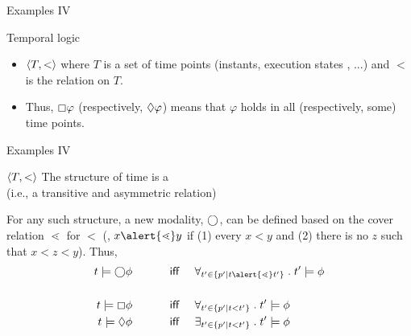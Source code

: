 \documentclass{beamer}
\begin{document}
\begin{slide}{Examples IV}\label{s:18}
\small
\begin{block}{Temporal logic}
\begin{itemize}
\item $\mathopen{\langle}T, <\mathclose{\rangle}$ where $T$ is a set of time points (instants, execution states , ...) and $<$ is the  relation on $T$.
\item Thus, $\boxempty \varphi$ (respectively, $\Diamond \varphi$) means that $\varphi$ holds in all (respectively, some)  time points.
\end{itemize}
\end{block}
\end{slide}

\begin{slide}{Examples IV}\label{s:18a}
\small

\begin{block}{$\mathopen{\langle}T,<\mathclose{\rangle}$}
The structure of time is a  \\ (i.e., a transitive and asymmetric relation)
\vspace{0.3cm}

\noindent
For any such structure, a new modality, $\bigcirc$, can be defined based on the \alert{cover} relation \alert{$\lessdot$} for $<$ 
(\ie, $x\alert{\lessdot} y$ if (1) every $x<y$ and (2) there is no $z$ such that $x<z<y$).
Thus,
\begin{align*}
t  \models \nexts \phi &\text{ ~~~~~~~~ \textsf{iff} ~~~} 
\universal{t' \in \setdef{p'}{t \alert{\lessdot} t' }}{t' \models \phi} \\ &\\
t  \models \always \phi &\text{ ~~~~~~~~ \textsf{iff} ~~~} 
\universal{t' \in \setdef{p'}{t < t' }}{t' \models \phi} \\
t  \models \eventual \phi &\text{ ~~~~~~~~ \textsf{iff} ~~~} 
\existential{t' \in \setdef{p'}{t < t' }}{t' \models \phi} \\
\end{align*}
\end{block}

\end{slide}
\end{document}
